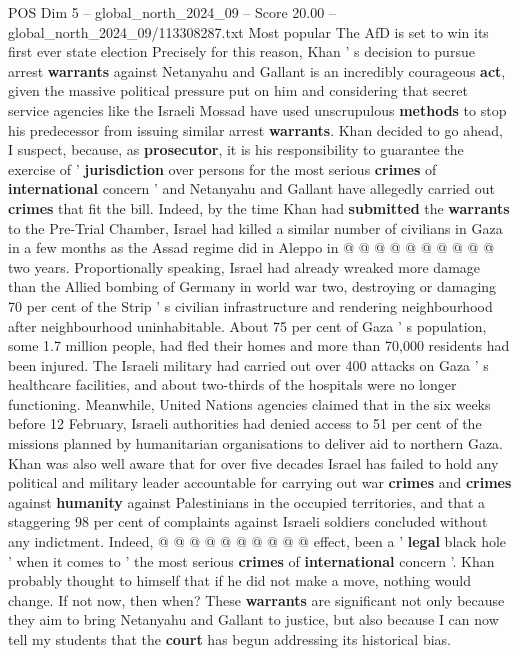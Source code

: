 \begin{textsample}{POS Dim 5 – global\_north\_2024\_09 – Score 20.00 – global\_north\_2024\_09/113308287.txt}
Most popular The AfD is set to win its first ever state election Precisely for this reason, Khan ' s decision to pursue arrest \textbf{warrants} against Netanyahu and Gallant is an incredibly courageous \textbf{act}, given the massive political pressure put on him and considering that secret service agencies like the Israeli Mossad have used unscrupulous \textbf{methods} to stop his predecessor from issuing similar arrest \textbf{warrants}.
Khan decided to go ahead, I suspect, because, as \textbf{prosecutor}, it is his responsibility to guarantee the exercise of ' \textbf{jurisdiction} over persons for the most serious \textbf{crimes} of \textbf{international} concern ' and Netanyahu and Gallant have allegedly carried out \textbf{crimes} that fit the bill.
Indeed, by the time Khan had \textbf{submitted} the \textbf{warrants} to the Pre-Trial Chamber, Israel had killed a similar number of civilians in Gaza in a few months as the Assad regime did in Aleppo in @ @ @ @ @ @ @ @ @ @ two years.
Proportionally speaking, Israel had already wreaked more damage than the Allied bombing of Germany in world war two, destroying or damaging 70 per cent of the Strip ' s civilian infrastructure and rendering neighbourhood after neighbourhood uninhabitable.
About 75 per cent of Gaza ' s population, some 1.7 million people, had fled their homes and more than 70,000 residents had been injured.
The Israeli military had carried out over 400 attacks on Gaza ' s healthcare facilities, and about two-thirds of the hospitals were no longer functioning.
Meanwhile, United Nations agencies claimed that in the six weeks before 12 February, Israeli authorities had denied access to 51 per cent of the missions planned by humanitarian organisations to deliver aid to northern Gaza.
Khan was also well aware that for over five decades Israel has failed to hold any political and military leader accountable for carrying out war \textbf{crimes} and \textbf{crimes} against \textbf{humanity} against Palestinians in the occupied territories, and that a staggering 98 per cent of complaints against Israeli soldiers concluded without any indictment.
Indeed, @ @ @ @ @ @ @ @ @ @ effect, been a ' \textbf{legal} black hole ' when it comes to ' the most serious \textbf{crimes} of \textbf{international} concern '.
Khan probably thought to himself that if he did not make a move, nothing would change.
If not now, then when?
These \textbf{warrants} are significant not only because they aim to bring Netanyahu and Gallant to justice, but also because I can now tell my students that the \textbf{court} has begun addressing its historical bias.

\end{textsample}
